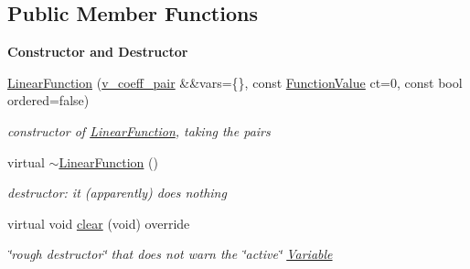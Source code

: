 \subsection*{Public Member Functions}
\begin{Indent}\textbf{ Constructor and Destructor}\par
\begin{DoxyCompactItemize}
\item 
\mbox{\hyperlink{class_s_m_spp__di__unipi__it_1_1_linear_function_a835aa4d40952b780da6525aa9c38f226}{Linear\+Function}} (\mbox{\hyperlink{class_s_m_spp__di__unipi__it_1_1_linear_function_aee8988faa66c7c9013613e2c76580ddf}{v\+\_\+coeff\+\_\+pair}} \&\&vars=\{\}, const \mbox{\hyperlink{class_s_m_spp__di__unipi__it_1_1_function_a9ad432406b609e28d340f73e9474bffe}{Function\+Value}} ct=0, const bool ordered=false)
\begin{DoxyCompactList}\small\item\em constructor of \mbox{\hyperlink{class_s_m_spp__di__unipi__it_1_1_linear_function}{Linear\+Function}}, taking the pairs \end{DoxyCompactList}\item 
\mbox{\label{class_s_m_spp__di__unipi__it_1_1_linear_function_ab9ac66e15c4e7bbe1a3e37941e075a13}} 
virtual \mbox{\hyperlink{class_s_m_spp__di__unipi__it_1_1_linear_function_ab9ac66e15c4e7bbe1a3e37941e075a13}{$\sim$\+Linear\+Function}} ()
\begin{DoxyCompactList}\small\item\em destructor\+: it (apparently) does nothing \end{DoxyCompactList}\item 
virtual void \mbox{\hyperlink{class_s_m_spp__di__unipi__it_1_1_linear_function_a9862fdd31593937c218bbda548c85fcc}{clear}} (void) override
\begin{DoxyCompactList}\small\item\em \char`\"{}rough destructor\char`\"{} that does not warn the \char`\"{}active\char`\"{} \mbox{\hyperlink{class_s_m_spp__di__unipi__it_1_1_variable}{Variable}} \end{DoxyCompactList}\end{DoxyCompactItemize}
\end{Indent}
